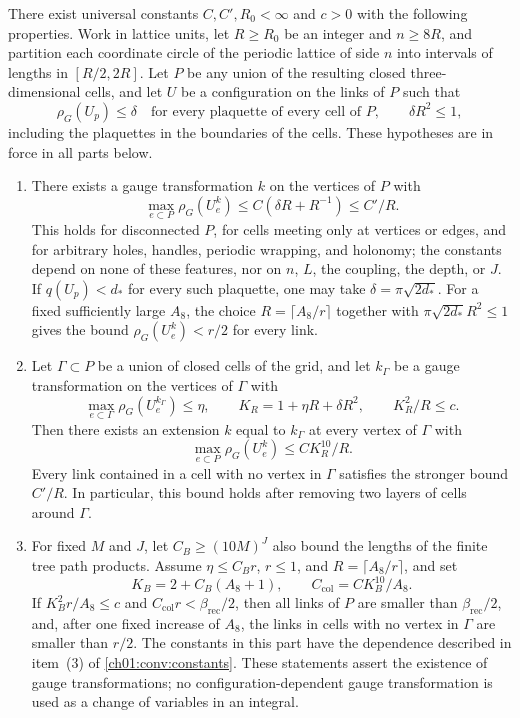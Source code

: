 \begin{theorem}\label{ch18:thm:fat-cell-admission}
There exist universal constants $C,C',R_0<\infty$ and $c>0$ with the following properties. Work in lattice units, let $R\ge R_0$ be an integer and $n\ge8R$, and partition each coordinate circle of the periodic lattice of side $n$ into intervals of lengths in $[R/2,2R]$. Let $P$ be any union of the resulting closed three-dimensional cells, and let $U$ be a configuration on the links of $P$ such that
\[
 \rho_G(U_p)\le\delta\quad\text{for every plaquette of every cell of }P,\qquad \delta R^2\le1,
\]
including the plaquettes in the boundaries of the cells. These hypotheses are in force in all parts below.
\begin{enumerate}
\item There exists a gauge transformation $k$ on the vertices of $P$ with
\[
 \max_{e\subset P}\rho_G(U_e^k)\le C(\delta R+R^{-1})\le C'/R.
\]
This holds for disconnected $P$, for cells meeting only at vertices or edges, and for arbitrary holes, handles, periodic wrapping, and holonomy; the constants depend on none of these features, nor on $n$, $L$, the coupling, the depth, or $J$. If $q(U_p)<d_*$ for every such plaquette, one may take $\delta=\pi\sqrt{2d_*}$. For a fixed sufficiently large $A_8$, the choice $R=\lceil A_8/r\rceil$ together with $\pi\sqrt{2d_*}R^2\le1$ gives the bound $\rho_G(U_e^k)<r/2$ for every link.
\item Let $\Gamma\subset P$ be a union of closed cells of the grid, and let $k_\Gamma$ be a gauge transformation on the vertices of $\Gamma$ with
\[
 \max_{e\subset\Gamma}\rho_G(U_e^{k_\Gamma})\le\eta,\qquad K_R=1+\eta R+\delta R^2,\qquad K_R^2/R\le c.
\]
Then there exists an extension $k$ equal to $k_\Gamma$ at every vertex of $\Gamma$ with
\[
 \max_{e\subset P}\rho_G(U_e^k)\le CK_R^{10}/R.
\]
Every link contained in a cell with no vertex in $\Gamma$ satisfies the stronger bound $C'/R$. In particular, this bound holds after removing two layers of cells around $\Gamma$.
\item For fixed $M$ and $J$, let $C_B\ge(10M)^J$ also bound the lengths of the finite tree path products. Assume $\eta\le C_Br$, $r\le1$, and $R=\lceil A_8/r\rceil$, and set
\[
 K_B=2+C_B(A_8+1),\qquad C_{\mathrm{col}}=CK_B^{10}/A_8.
\]
If $K_B^2r/A_8\le c$ and $C_{\mathrm{col}}r<\beta_{\mathrm{rec}}/2$, then all links of $P$ are smaller than $\beta_{\mathrm{rec}}/2$, and, after one fixed increase of $A_8$, the links in cells with no vertex in $\Gamma$ are smaller than $r/2$. The constants in this part have the dependence described in item~(3) of \cref{ch01:conv:constants}. These statements assert the existence of gauge transformations; no configuration-dependent gauge transformation is used as a change of variables in an integral.

\end{enumerate}
\end{theorem}

